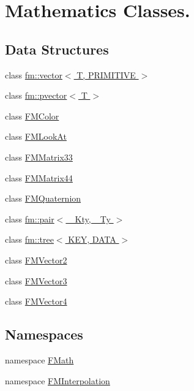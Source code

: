 \hypertarget{group__FMath}{
\section{Mathematics Classes.}
\label{group__FMath}
}
\subsection*{Data Structures}
\begin{DoxyCompactItemize}
\item 
class \hyperlink{classfm_1_1vector}{fm::vector$<$ T, PRIMITIVE $>$}
\item 
class \hyperlink{classfm_1_1pvector}{fm::pvector$<$ T $>$}
\item 
class \hyperlink{classFMColor}{FMColor}
\item 
class \hyperlink{classFMLookAt}{FMLookAt}
\item 
class \hyperlink{classFMMatrix33}{FMMatrix33}
\item 
class \hyperlink{classFMMatrix44}{FMMatrix44}
\item 
class \hyperlink{classFMQuaternion}{FMQuaternion}
\item 
class \hyperlink{classfm_1_1pair}{fm::pair$<$ \_\-Kty, \_\-Ty $>$}
\item 
class \hyperlink{classfm_1_1tree}{fm::tree$<$ KEY, DATA $>$}
\item 
class \hyperlink{classFMVector2}{FMVector2}
\item 
class \hyperlink{classFMVector3}{FMVector3}
\item 
class \hyperlink{classFMVector4}{FMVector4}
\end{DoxyCompactItemize}
\subsection*{Namespaces}
\begin{DoxyCompactItemize}
\item 
namespace \hyperlink{namespaceFMath}{FMath}
\item 
namespace \hyperlink{namespaceFMInterpolation}{FMInterpolation}
\end{DoxyCompactItemize}
